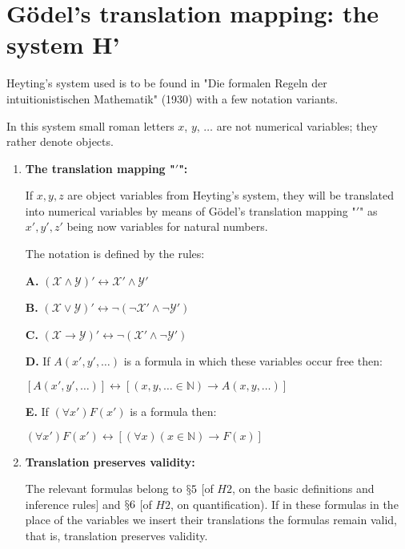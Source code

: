 \documentclass[12pt]{article}
\begin{document}
\section{G\"{o}del's translation mapping: the system H'}\normalsize

Heyting's system used is to be found in "Die formalen Regeln der intuitionistischen Mathematik" (1930) with a few notation variants.

In this system small roman letters $x$, $y$, $\ldots$ are not numerical variables; they rather denote objects.

\begin{enumerate}
\item \textbf{The translation mapping "$\prime$":}

If $x, y, z$ are object variables from Heyting's system, they will be translated into numerical variables by means of G\"{o}del's translation mapping "$\prime$" as $x', y', z'$ being now variables for natural numbers.

The notation is defined by the rules:

\textbf{A.} $(\mathcal{X} \wedge \mathcal{Y})' \leftrightarrow \mathcal{X}' \wedge \mathcal{Y}'$

\textbf{B.} $(\mathcal{X} \vee \mathcal{Y})' \leftrightarrow \neg (\neg \mathcal{X}' \wedge \neg \mathcal{Y}')$

\textbf{C.} $(\mathcal{X} \rightarrow \mathcal{Y})' \leftrightarrow \neg (\mathcal{X}' \wedge \neg \mathcal{Y}')$ 

\textbf{D.} If $A (x', y', \ldots)$ is a formula in which these variables occur free then:

\begin{center}
$[A (x', y', \ldots)] \leftrightarrow [(x, y, \ldots \in \mathbb{N}) \rightarrow A (x, y, \ldots)]$
\end{center}

\textbf{E.} If $(\forall x') F (x')$ is a formula then:

\begin{center}
$(\forall x') F (x') \leftrightarrow [(\forall x) (x \in \mathbb{N}) \rightarrow F (x)]$
\end{center}

\item \textbf{Translation preserves validity:}

The relevant formulas belong to $\mathsection 5$ [of $H2$, on the basic definitions and inference rules] and $\mathsection 6$ [of $H2$, on quantification). If in these formulas in the place of the variables we insert their translations the formulas remain valid, that is, translation preserves validity.


\end{enumerate}
\end{document}
